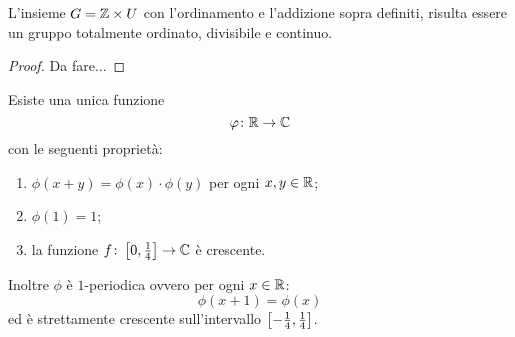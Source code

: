 \begin{theorem}%
  \label{th:gruppo_su_U}%
L'insieme $G={\mathbb Z} \times U$ con l'ordinamento 
e l'addizione sopra definiti, risulta essere un gruppo 
totalmente ordinato, divisibile e continuo.
\end{theorem}

\begin{proof}
  Da fare...
\end{proof}

\begin{theorem}[omomorfismo su $U$]%
  \label{th:omomorfismo_U}%
Esiste una unica funzione 
\[
 \varphi\colon {\mathbb R} \to {\mathbb C}  
\]
con le seguenti proprietà:
\begin{enumerate}
  \item $\phi(x+y) = \phi(x)\cdot \phi(y)$ per ogni $x,y\in{\mathbb R}$;
  \item $\phi(1) = 1$;
  \item la funzione $f\colon\left[0,\frac 1 4\right]\to {\mathbb C}$
  è crescente.
\end{enumerate}

Inoltre 
$\phi$ è $1$-periodica ovvero per ogni $x\in {\mathbb R}$:
  \[
      \phi(x+1) = \phi(x)
  \]
ed è strettamente crescente sull'intervallo $\left[-\frac 1 4,\frac 1 4\right]$.
\end{theorem}
%
